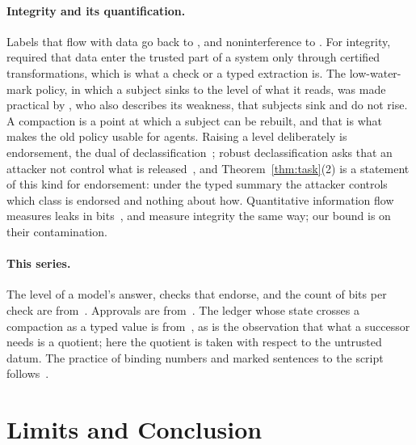 \documentclass[acmsmall,nonacm,screen]{acmart}
\begin{document}
\paragraph{Integrity and its quantification.} Labels that flow with data go back to
\citet{denning1976}, and noninterference to \citet{goguen1982}. For integrity,
\citet{clark1987} required that data enter the trusted part of a system only through
certified transformations, which is what a check or a typed extraction is. The
low-water-mark policy, in which a subject sinks to the level of what it reads, was made
practical by \citet{fraser2000}, who also describes its weakness, that subjects sink and do
not rise. A compaction is a point at which a subject can be rebuilt, and that is what makes
the old policy usable for agents. Raising a level deliberately is endorsement, the dual of
declassification~\cite{sabelfeld2003,sabelfeld2009}; robust declassification asks that an
attacker not control what is released~\cite{zdancewic2001,myers2006}, and
Theorem~\ref{thm:task}(2) is a statement of this kind for endorsement: under the typed
summary the attacker controls which class is endorsed and nothing about how. Quantitative
information flow measures leaks in bits~\cite{smith2009}, and \citet{clarkson2010} measure
integrity the same way; our bound is on their contamination.

\paragraph{This series.} The level of a model's answer, checks that endorse, and the count of
bits per check are from~\cite{tpp7}. Approvals are from~\cite{tpp4}. The ledger whose state
crosses a compaction as a typed value is from~\cite{tpp12}, as is the observation that what a
successor needs is a quotient; here the quotient is taken with respect to the untrusted
datum. The practice of binding numbers and marked sentences to the script
follows~\cite{tpp10}.

\section{Limits and Conclusion}
\label{sec:limits}
\end{document}

